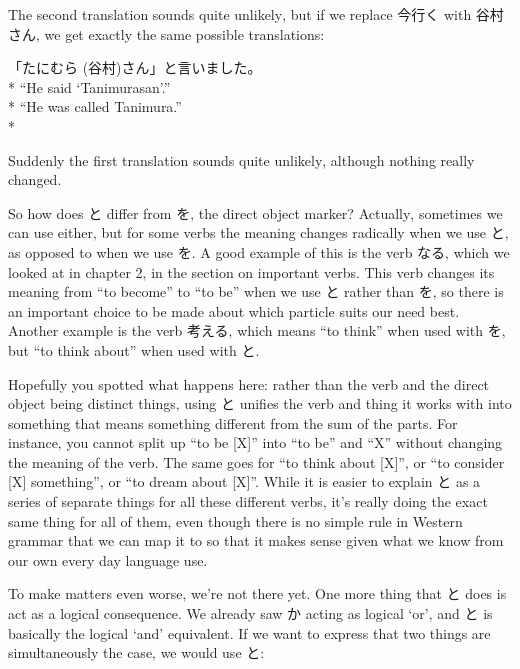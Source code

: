 \documentclass[11pt, b5paper, twoside, openright, onecolumn]{book}
\makeatletter
\newcommand*{\rubystack}[2]{{\relscale{0.5}%
  \begin{tabular}[b]{@{}c@{}}%
    {#1}\\%
   {\textscale{2}{#2}}%
  \end{tabular}}%
}
\DeclareRobustCommand*{\ruby}[2]{%
  \mbox{%
    \setlength{\parskip}{0ex}%
    \BeginAccSupp{method=pdfstringdef,ActualText={#1}}%
      \rubystack{\phantom{#2}}{#1}%
      \llap{%
        \rubystack{#2}{\phantom{#1}}%
      }%
    \EndAccSupp{}%
  }%
}
\renewcommand*{\ruby}[2]{#2 (#1)}%
\newenvironment{exampleblock}{
\setlength{\parindent}{0.6in}
\begin{minipage}[t]{\dimexpr\textwidth-\parindent}}
{\end{minipage}}
\makeatother
\begin{document}
The second translation sounds quite unlikely‚ but if we replace 今行く with 谷村さん‚ we get exactly the same possible translations:

\vspace{0.4cm}
\begin{exampleblock}
「\ruby{谷村}{たにむら}さん」と言いました。 \\* 
“He said ‘Tanimurasan’.” \\* 
“He was called Tanimura.” \\* 
\end{exampleblock}
\vspace{0.2cm}

Suddenly the first translation sounds quite unlikely‚ although nothing really changed.

So how does と differ from を‚ the direct object marker? Actually‚ sometimes we can use either‚ but for some verbs the meaning changes radically when we use と‚ as opposed to when we use を. A good example of this is the verb なる‚ which we looked at in chapter 2‚ in the section on important verbs. This verb changes its meaning from “to become” to “to be” when we use と rather than を‚ so there is an important choice to be made about which particle suits our need best. Another example is the verb 考える‚ which means “to think” when used with を‚ but “to think about” when used with と.

Hopefully you spotted what happens here: rather than the verb and the direct object being distinct things‚ using と unifies the verb and thing it works with into something that means something different from the sum of the parts. For instance‚ you cannot split up “to be [X]” into “to be” and “X” without changing the meaning of the verb. The same goes for “to think about [X]”‚ or “to consider [X] something”‚ or “to dream about [X]”. While it is easier to explain と as a series of separate things for all these different verbs‚ it’s really doing the exact same thing for all of them‚ even though there is no simple rule in Western grammar that we can map it to so that it makes sense given what we know from our own every day language use.

To make matters even worse‚ we’re not there yet. One more thing that と does is act as a logical consequence. We already saw か acting as logical ‘or’‚ and と is basically the logical ‘and’ equivalent. If we want to express that two things are simultaneously the case‚ we would use と:
\end{document}
